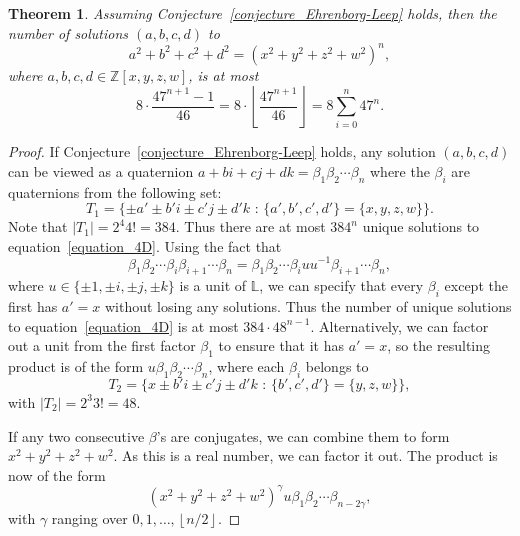 \documentclass[12pt,table]{article}
\newtheorem{theorem}{Theorem}[section]
\theoremstyle{definition}
\theoremstyle{remark}
\newcommand{\Zzz}{\mathbb Z}
\newcommand{\Lll}{\mathbb L}
\numberwithin{equation}{section}
\newcommand{\myfrac}[2]{#1 / #2}
\begin{document}
\begin{theorem}
\label{theorem_counting_4D}
Assuming Conjecture~\ref{conjecture_Ehrenborg-Leep} holds,
then the number of solutions $ (a, b, c, d) $ to
\begin{equation}
\label{equation_4D}
a^2 + b^2 + c^2 + d^2 = (x^2 + y^2 + z^2 + w^2)^n,
\end{equation}
where $ a, b, c, d \in \Zzz[x,y,z,w]$,
is at most
\[
8 \cdot \frac{47^{n+1} - 1}{46}
=  8 \cdot \left\lfloor \frac{ 47^{n+1} }{46} \right\rfloor
=  8 \sum_{i = 0}^n{47^n}.
\]
\end{theorem}
\begin{proof}
If Conjecture~\ref{conjecture_Ehrenborg-Leep} holds, any
solution
$ (a, b, c, d) $ can be viewed as a quaternion
$ a + bi + cj + dk = \beta_1 \beta_2 \dotsm \beta_n $
where the $\beta_i$ are quaternions from the following set:
\[
T_1 = \{ \pm a' \pm b'i \pm c'j \pm d'k
\text{ : } \{ a', b', c', d' \} = \{ x, y, z, w \} \}. 
\]
Note that $ | T_1 | = 2^4 4! = 384 $.
Thus there are at most $ 384^n $ unique solutions to equation~\eqref{equation_4D}.
Using the fact that
\[
\beta_1 \beta_2 \dotsm \beta_i \beta_{i+1} \dotsm \beta_n
=
\beta_1 \beta_2 \dotsm \beta_i u u^{-1} \beta_{i+1} \dotsm \beta_n,
\]
where $ u \in \{ \pm 1 , \pm i, \pm j, \pm k \} $ is a unit of $\Lll$,
we can specify
that every $\beta_i$ except the first has $ a' = x $ without
losing any solutions. Thus the number of unique solutions
to equation~\eqref{equation_4D} is at most
$ 384 \cdot 48^{n-1} $. Alternatively, we can factor out a unit
from the first factor $\beta_1$ to ensure that it has $ a' = x $, so the
resulting product is of the form $ u \beta_1 \beta_2 \dotsm \beta_n $,
where each $ \beta_i $ belongs to
\[
T_2 = \{ x \pm b'i \pm c'j \pm d'k
\text{ : } \{ b', c', d' \} = \{ y, z, w \} \},
\]
with $ | T_2 | = 2^3 3! = 48 $.

If any two consecutive $ \beta $'s are conjugates, we can combine them
to form $ x^2 + y^2 + z^2 + w^2 $. As this is a real number, we can
factor it out. The product is now of the form
\[
(x^2 + y^2 + z^2 + w^2)^\gamma u \beta_1 \beta_2 \dotsm \beta_{n-2\gamma},
\]
with $ \gamma $ ranging over $ 0, 1, \dotsc, \left\lfloor \myfrac{n}{2} \right\rfloor $.


\end{proof}
\end{document}
